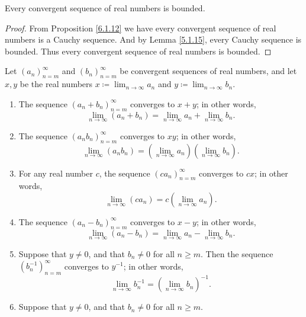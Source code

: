 \begin{corollary}\label{6.1.17}
    Every convergent sequence of real numbers is bounded.
\end{corollary}

\begin{proof}
    From Proposition \ref{6.1.12} we have every convergent sequence of real numbers is a Cauchy sequence.
    And by Lemma \ref{5.1.15}, every Cauchy sequence is bounded.
    Thus every convergent sequence of real numbers is bounded.
\end{proof}

\setcounter{theorem}{18}
\begin{theorem}\label{6.1.19}
    Let \((a_n)_{n = m}^\infty\) and \((b_n)_{n = m}^\infty\) be convergent sequences of real numbers, and let \(x, y\) be the real numbers \(x \coloneqq \lim_{n \to \infty} a_n\) and \(y \coloneqq \lim_{n \to \infty} b_n\).
    \begin{enumerate}
        \item The sequence \((a_n + b_n)_{n = m}^\infty\) converges to \(x + y\);
              in other words,
              \[
                  \lim_{n \to \infty} (a_n + b_n) = \lim_{n \to \infty} a_n + \lim_{n \to \infty} b_n.
              \]
        \item The sequence \((a_n b_n)_{n = m}^\infty\) converges to \(xy\);
              in other words,
              \[
                  \lim_{n \to \infty} (a_n b_n) = (\lim_{n \to \infty} a_n)(\lim_{n \to \infty} b_n).
              \]
        \item For any real number \(c\), the sequence \((c a_n)_{n = m}^\infty\) converges to \(cx\);
              in other words,
              \[
                  \lim_{n \to \infty} (c a_n) = c(\lim_{n \to \infty} a_n).
              \]
        \item The sequence \((a_n - b_n)_{n = m}^\infty\) converges to \(x - y\);
              in other words,
              \[
                  \lim_{n \to \infty} (a_n - b_n) = \lim_{n \to \infty} a_n - \lim_{n \to \infty} b_n.
              \]
        \item Suppose that \(y \neq 0\), and that \(b_n \neq 0\) for all \(n \geq m\).
              Then the sequence \((b_n^{-1})_{n = m}^\infty\) converges to \(y^{-1}\);
              in other words,
              \[
                  \lim_{n \to \infty} b_n^{-1} = (\lim_{n \to \infty} b_n)^{-1}.
              \]
        \item Suppose that \(y \neq 0\), and that \(b_n \neq 0\) for all \(n \geq m\).

\end{enumerate}
\end{theorem}
